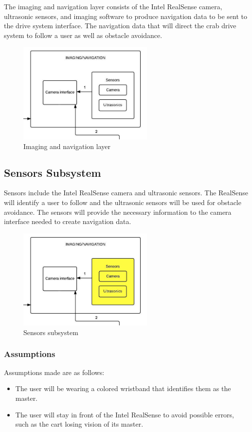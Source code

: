 The imaging and navigation layer consists of the Intel RealSense camera, ultrasonic sensors, and imaging software to produce navigation data to be sent to the drive system interface. The navigation data that will direct the crab drive system to follow a user as well as obstacle avoidance.

\begin{figure}[h!]
	\centering
 	\includegraphics[width=0.60\textwidth]{images/imaging}
 \caption{Imaging and navigation layer}
\end{figure}

\subsection{Sensors Subsystem}
Sensors include the Intel RealSense camera and ultrasonic sensors. The RealSense will identify a user to follow and the ultrasonic sensors will be used for obstacle avoidance. The sensors will provide the necessary information to the camera interface needed to create navigation data.

\begin{figure}[h!]
	\centering
 	\includegraphics[width=0.60\textwidth]{images/imaging_sensors}
 \caption{Sensors subsystem}
\end{figure}

\subsubsection{Assumptions}
Assumptions made are as follows:
\begin{itemize}
	\item The user will be wearing a colored wristband that identifies them as the master.
	\item The user will stay in front of the Intel RealSense to avoid possible errors, such as the cart losing vision of its master.
\end{itemize}

